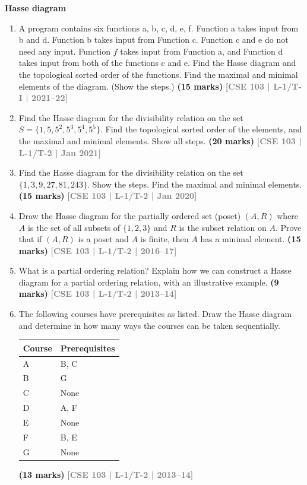 \documentclass[12pt,a3paper]{article}
\newcommand{\yr}[1]{\hfill\textcolor{gray}{\small\textbf{[#1]}}}
\newcommand{\mk}[1]{\textcolor{orange!70!black}{\small\textbf{(#1 marks)}}}
\newcommand{\subtopic}[2]{%
  \vspace{10pt}
  \noindent\begin{tcolorbox}[colback=#1!8,colframe=#1,boxrule=0.6pt,arc=4pt,
    left=6pt,right=6pt,top=4pt,bottom=4pt]
    \small\bfseries\textcolor{#1}{#2}
  \end{tcolorbox}
  \vspace{2pt}
}
\begin{document}
\subtopic{cB}{Hasse diagram}
\label{sub:s4-hasse}

\begin{enumerate}

\item A program contains six functions a, b, c, d, e, f. Function a takes input from b and d. Function b takes input from Function c. Function c and e do not need any input. Function $f$ takes input from Function a, and Function d takes input from both of the functions c and e. Find the Hasse diagram and the topological sorted order of the functions. Find the maximal and minimal elements of the diagram. (Show the steps.)
\mk{15} \yr{CSE 103 | L-1/T-I | 2021--22}  
  
\item Find the Hasse diagram for the divisibility relation on the set $S = \{1, 5, 5^2, 5^3, 5^4, 5^5\}$. Find the topological sorted order of the elements, and the maximal and minimal elements. Show all steps.
\mk{20} \yr{CSE 103 | L-1/T-2 | Jan 2021}  

\item Find the Hasse diagram for the divisibility relation on the set $\{1, 3, 9, 27, 81, 243\}$. Show the steps. Find the maximal and minimal elements.
\mk{15} \yr{CSE 103 | L-1/T-2 | Jan 2020}

\item Draw the Hasse diagram for the partially ordered set (poset) $(A, R)$ where $A$ is the set of all subsets of $\{1, 2, 3\}$ and $R$ is the subset relation on $A$. Prove that if $(A, R)$ is a poset and $A$ is finite, then $A$ has a minimal element.
\mk{15} \yr{CSE 103 | L-1/T-2 | 2016--17}  


\item What is a partial ordering relation? Explain how we can construct a Hasse diagram for a partial ordering relation, with an illustrative example.
\mk{9} \yr{CSE 103 | L-1/T-2 | 2013--14}

\item The following courses have prerequisites as listed. Draw the Hasse diagram and determine in how many ways the courses can be taken sequentially.
\begin{center}
\begin{tabular}{ll}
\toprule
\textbf{Course} & \textbf{Prerequisites} \\\midrule
A & B, C \\
B & G \\
C & None \\
D & A, F \\
E & None \\
F & B, E \\
G & None \\\bottomrule
\end{tabular}
\end{center}
\mk{13} \yr{CSE 103 | L-1/T-2 | 2013--14}  



\end{enumerate}
\end{document}
